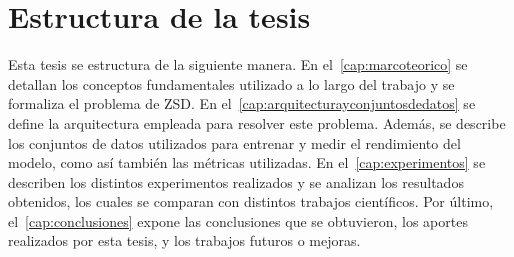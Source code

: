 \section{Estructura de la tesis} \label{sec:estructuradelatesis}

Esta tesis se estructura de la siguiente manera. En el~\autoref{cap:marcoteorico} se detallan los conceptos fundamentales utilizado a lo largo del trabajo y se formaliza el problema de ZSD. En el~\autoref{cap:arquitecturayconjuntosdedatos} se define la arquitectura empleada para resolver este problema. Además, se describe los conjuntos de datos utilizados para entrenar y medir el rendimiento del modelo, como así también las métricas utilizadas. En el~\autoref{cap:experimentos} se describen los distintos experimentos realizados y se analizan los resultados obtenidos, los cuales se comparan con distintos trabajos científicos. Por último, el~\autoref{cap:conclusiones} expone las conclusiones que se obtuvieron, los aportes realizados por esta tesis, y los trabajos futuros o mejoras.
